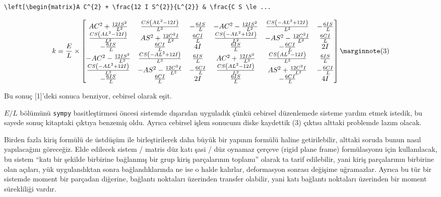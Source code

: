 \documentclass[12pt,fleqn]{article}\usepackage{../../common}
\begin{document}
\begin{verbatim}
\left[\begin{matrix}A C^{2} + \frac{12 I S^{2}}{L^{2}} & \frac{C S \le ...
\end{verbatim}

$$
k = 
\frac{E}{L} \times 
\left[\begin{matrix}A C^{2} + \frac{12 I S^{2}}{L^{2}} & \frac{C S \left(A L^{2} - 12 I\right)}{L^{2}} & - \frac{6 I S}{L} & - A C^{2} - \frac{12 I S^{2}}{L^{2}} & \frac{C S \left(- A L^{2} + 12 I\right)}{L^{2}} & - \frac{6 I S}{L}\\\frac{C S \left(A L^{2} - 12 I\right)}{L^{2}} & A S^{2} + \frac{12 C^{2} I}{L^{2}} & \frac{6 C I}{L} & \frac{C S \left(- A L^{2} + 12 I\right)}{L^{2}} & - A S^{2} - \frac{12 C^{2} I}{L^{2}} & \frac{6 C I}{L}\\- \frac{6 I S}{L} & \frac{6 C I}{L} & 4 I & \frac{6 I S}{L} & - \frac{6 C I}{L} & 2 I\\- A C^{2} - \frac{12 I S^{2}}{L^{2}} & \frac{C S \left(- A L^{2} + 12 I\right)}{L^{2}} & \frac{6 I S}{L} & A C^{2} + \frac{12 I S^{2}}{L^{2}} & \frac{C S \left(A L^{2} - 12 I\right)}{L^{2}} & \frac{6 I S}{L}\\\frac{C S \left(- A L^{2} + 12 I\right)}{L^{2}} & - A S^{2} - \frac{12 C^{2} I}{L^{2}} & - \frac{6 C I}{L} & \frac{C S \left(A L^{2} - 12 I\right)}{L^{2}} & A S^{2} + \frac{12 C^{2} I}{L^{2}} & - \frac{6 C I}{L}\\- \frac{6 I S}{L} & \frac{6 C I}{L} & 2 I & \frac{6 I S}{L} & - \frac{6 C I}{L} & 4 I\end{matrix}\right]
\mlabel{3}
$$

Bu sonuç [1]'deki sonuca benziyor, cebirsel olarak eşit.

$E/L$ bölümünü \verb!sympy! basitleştirmesi öncesi sistemde dışarıdan uyguladık
çünkü cebirsel düzenlemede sisteme yardım etmek istedik, bu sayede sonuç
kitaptaki çıktıya benzemiş oldu. Ayrıca cebirsel işlem sonucunu diske kaydettik
(3) çıktısı alttaki problemde lazım olacak.

Birden fazla kiriş formülü de üstdüşüm ile birleştirilerek daha büyük bir
yapının formülü haline getirilebilir, alttaki soruda bunun nasıl yapılacağını
göreceğiz. Elde edilecek sistem / matris düz katı şasi / düz oynamaz çerçeve
(rigid plane frame) formülasyonu için kullanılacak, bu sistem ``katı bir şekilde
birbirine bağlanmış bir grup kiriş parçalarının toplamı'' olarak ta tarif
edilebilir, yani kiriş parçalarının birbirine olan açıları, yük uygulandıktan
sonra bağlandıklarında ne ise o halde kalırlar, deformasyon sonrası değişime
uğramazlar. Ayrıca bu tür bir sistemde moment bir parçadan diğerine, bağlantı
noktaları üzerinden transfer olabilir, yani katı bağlantı noktaları üzerinden
bir moment sürekliliği vardır.
\end{document}

